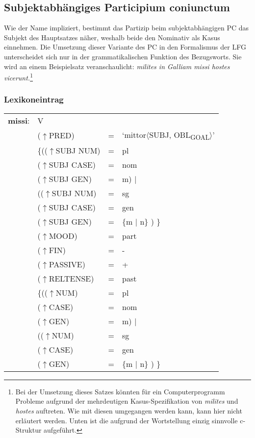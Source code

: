 \documentclass[12pt,a4paper]{article}
\begin{document}
\subsection{Subjektabhängiges Participium coniunctum}
Wie der Name impliziert, bestimmt das Partizip beim subjektabhängigen PC das Subjekt des Hauptsatzes näher, weshalb beide den Nominativ als Kasus einnehmen. Die Umsetzung dieser Variante des PC in den Formalismus der LFG unterscheidet sich nur in der grammatikalischen Funktion des Bezugsworts. Sie wird an einem Beispielsatz veranschaulicht:
\textit{milites in Galliam missi hostes vicerunt.}\footnote{Bei der Umsetzung dieses Satzes könnten für ein Computerprogramm Probleme aufgrund der mehrdeutigen Kasus-Spezifikation von \textit{milites} und \textit{hostes} auftreten. Wie mit diesen umgegangen werden kann, kann hier nicht erläutert werden. Unten ist die aufgrund der Wortstellung einzig sinnvolle c-Struktur aufgeführt.}

\subsubsection{Lexikoneintrag}
\begin{singlespace}
\begin{tabular}{ l  l  l  l  } 
\textbf{missi}: & \: V \\
$\qquad$ & \:  ($\uparrow$PRED) & = & `mittor$\langle$SUBJ, OBL\textsubscript{GOAL}$\rangle$'\\
$\qquad$ & \:  \{(($\uparrow$SUBJ NUM) & = & pl \\ 
$\qquad$ & \: \: \: ($\uparrow$SUBJ CASE) & = & nom \\
$\qquad$ & \: \: \: ($\uparrow$SUBJ GEN) & = & m) $\mid$\\
$\qquad$ & \: \: (($\uparrow$SUBJ NUM) & = & sg \\ 
$\qquad$ & \: \: \: ($\uparrow$SUBJ CASE) & = & gen \\
$\qquad$ & \: \: \: ($\uparrow$SUBJ GEN) & = & \{m $\mid$ n\} ) \} \\
$\qquad$ & \:  ($\uparrow$MOOD) & = & part \\
$\qquad$ & \:  ($\uparrow$FIN) & = & - \\
$\qquad$ & \:  ($\uparrow$PASSIVE) & = & + \\
$\qquad$ & \: ($\uparrow$RELTENSE) & = & past \\
$\qquad$ & \:  \{(($\uparrow$NUM) & = & pl \\ 
$\qquad$ & \: \: \: ($\uparrow$CASE) & = & nom \\
$\qquad$ & \: \: \: ($\uparrow$GEN) & = & m) $\mid$\\
$\qquad$ & \: \: (($\uparrow$NUM) & = & sg \\ 
$\qquad$ & \: \: \: ($\uparrow$CASE) & = & gen \\
$\qquad$ & \: \: \: ($\uparrow$GEN) & = & \{m $\mid$ n\} ) \} \\
\end{tabular}
\end{singlespace}
\end{document}
